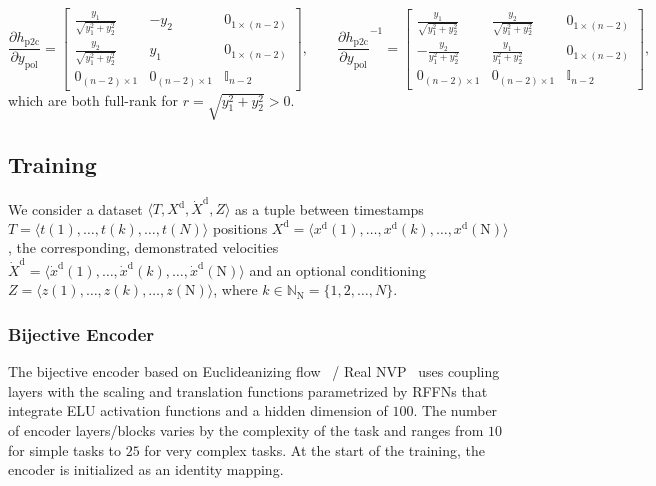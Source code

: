 \begin{equation}
    \frac{\partial h_{\mathrm{p2c}}}{\partial y_\mathrm{pol}} = \begin{bmatrix}
        \frac{y_1}{\sqrt{y_1^2 + y_2^2}} & -y_2 & 0_{1 \times (n-2)}\\
        \frac{y_2}{\sqrt{y_1^2 + y_2^2}} & y_1 & 0_{1 \times (n-2)}\\
        0_{(n-2) \times 1} & 0_{(n-2) \times 1} & \mathbb{I}_{n-2}
    \end{bmatrix},
    \qquad
    \frac{\partial h_{\mathrm{p2c}}}{\partial y_\mathrm{pol}}^{-1} = \begin{bmatrix}
        \frac{y_1}{\sqrt{y_1^2 + y_2^2}} & \frac{y_2}{\sqrt{y_1^2 + y_2^2}} & 0_{1 \times (n-2)}\\
        -\frac{y_2}{y_1^2 + y_2^2} & \frac{y_1}{y_1^2 + y_2^2} & 0_{1 \times (n-2)}\\
        0_{(n-2) \times 1} & 0_{(n-2) \times 1} & \mathbb{I}_{n-2}
    \end{bmatrix},
\end{equation}
which are both full-rank for $r = \sqrt{y_1^2 + y_2^2} > 0$.

\subsection{Training}\label{sub:osmp:methodology:training}
We consider a dataset $\langle T, X^\mathrm{d}, \dot{X}^\mathrm{d}, Z \rangle$ as a tuple between timestamps $T = \langle t(1), \dots, t(k), \dots, t(N) \rangle$ positions $X^\mathrm{d} = \langle x^\mathrm{d}(1), \dots, x^\mathrm{d}(k), \dots, x^\mathrm{d}(\mathrm{N}) \rangle$, the corresponding, demonstrated velocities $\dot{X}^\mathrm{d} = \langle \dot{x}^\mathrm{d}(1), \dots, \dot{x}^\mathrm{d}(k), \dots, \dot{x}^\mathrm{d}(\mathrm{N}) \rangle$ and an optional conditioning $Z = \langle z(1), \dots, z(k), \dots, z(\mathrm{N}) \rangle$, where $k \in \mathbb{N}_\mathrm{N} = \{1, 2, \dots, N \}$.
%

\subsubsection{Bijective Encoder}
The bijective encoder based on Euclideanizing flow~\citep{rana2020euclideanizing} / Real NVP~\citep{dinh2017density} uses coupling layers with the scaling and translation functions parametrized by \glspl{RFFN} that integrate ELU activation functions and a hidden dimension of $100$.
The number of encoder layers/blocks varies by the complexity of the task and ranges from $10$ for simple tasks to $25$ for very complex tasks.
At the start of the training, the encoder is initialized as an identity mapping.


